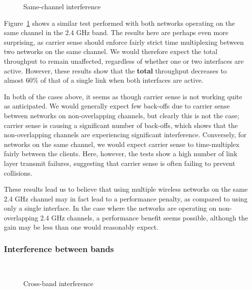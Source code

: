 \begin{figure}[h]
 \centering
 
 \caption{Same-channel interference}\label{graph:sc-interference}
\end{figure}

Figure~\ref{graph:sc-interference} shows a similar test performed with both
networks operating on the same channel in the 2.4 GHz band. The results here are
perhaps even more surprising, as carrier sense should enforce fairly strict time
multiplexing between two networks on the same channel. We would therefore expect
the total throughput to remain unaffected, regardless of whether one or two
interfaces are active. However, these results show that the \textbf{total}
throughput decreases to almost 60\% of that of a single link when both
interfaces are active.

In both of the cases above, it seems as though carrier sense is not working
quite as anticipated. We would generally expect few back-offs due to carrier
sense between networks on non-overlapping channels, but clearly this is not the
case; carrier sense is causing a significant number of back-offs, which shows
that the non-overlapping channels are experiencing significant interference.
Conversely, for networks on the same channel, we would expect carrier sense to
time-multiplex fairly between the clients. Here, however, the tests show a high
number of link layer transmit failures, suggesting that carrier sense is often
failing to prevent collisions.

These results lead us to believe that using multiple wireless networks on the
same 2.4 GHz channel may in fact lead to a performance penalty, as compared to
using only a single interface. In the case where the networks are operating on
non-overlapping 2.4 GHz channels, a performance benefit seems possible, although
the gain may be less than one would reasonably expect.


\subsubsection{Interference between bands}

\begin{figure}[h]
 \centering
 \subfloat[][uplink] {\
   \label{graph:cb-interference-up}
 }
 \\
 \subfloat[][downlink] {\
   \label{graph:cb-interference-down}
 }
 \caption{Cross-band interference}
\end{figure}

